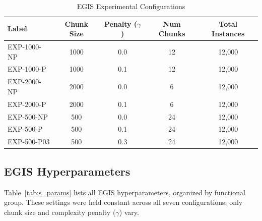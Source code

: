\documentclass[lettersize,10pt]{article}
\begin{document}
\begin{table}[htbp]
\centering
\caption{EGIS Experimental Configurations}
\label{tab:s_configs}
\footnotesize
\begin{tabular}{lcccc}
\toprule
\textbf{Label} & \textbf{Chunk Size} & \textbf{Penalty ($\gamma$)} & \textbf{Num Chunks} & \textbf{Total Instances} \\
\midrule
EXP-1000-NP & 1000 & 0.0 & 12 & 12{,}000 \\
EXP-1000-P & 1000 & 0.1 & 12 & 12{,}000 \\
EXP-2000-NP & 2000 & 0.0 & 6 & 12{,}000 \\
EXP-2000-P & 2000 & 0.1 & 6 & 12{,}000 \\
EXP-500-NP & 500 & 0.0 & 24 & 12{,}000 \\
EXP-500-P & 500 & 0.1 & 24 & 12{,}000 \\
EXP-500-P03 & 500 & 0.3 & 24 & 12{,}000 \\
\bottomrule
\end{tabular}
\end{table}

\subsection{EGIS Hyperparameters}
\label{sec:s1_params}
Table~\ref{tab:s_params} lists all EGIS hyperparameters, organized by functional group. These settings were held constant across all seven configurations; only chunk size and complexity penalty ($\gamma$) vary.
\end{document}
